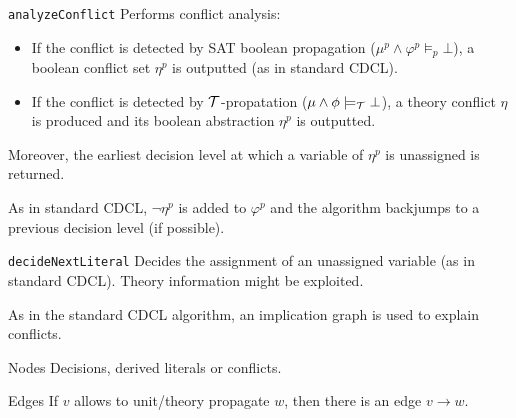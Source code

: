 \begin{description}
\begin{descriptionlist}
            \item[\texttt{analyzeConflict}]
                Performs conflict analysis:
                \begin{itemize}
                    \item If the conflict is detected by SAT boolean propagation ($\mu^p \land \varphi^p \models_p \bot$),
                        a boolean conflict set $\eta^p$ is outputted (as in standard CDCL).
                    \item If the conflict is detected by $\mathcal{T}$-propatation ($\mu \land \phi \models_{\mathcal{T}} \bot$),
                        a theory conflict $\eta$ is produced and its boolean abstraction $\eta^p$ is outputted.
                \end{itemize}
                Moreover, the earliest decision level at which a variable of $\eta^p$ is unassigned is returned.

                As in standard CDCL, $\lnot \eta^p$ is added to $\varphi^p$ and the algorithm backjumps to a previous decision level (if possible).

            \item[\texttt{decideNextLiteral}]
                Decides the assignment of an unassigned variable (as in standard CDCL).
                Theory information might be exploited.
        \end{descriptionlist}

    \item[Implication graph] 
        As in the standard CDCL algorithm, an implication graph is used to explain conflicts.
        \begin{descriptionlist}
            \item[Nodes] Decisions, derived literals or conflicts.
            \item[Edges] If $v$ allows to unit/theory propagate $w$, then there is an edge $v \rightarrow w$.
        \end{descriptionlist}
\end{description} 

